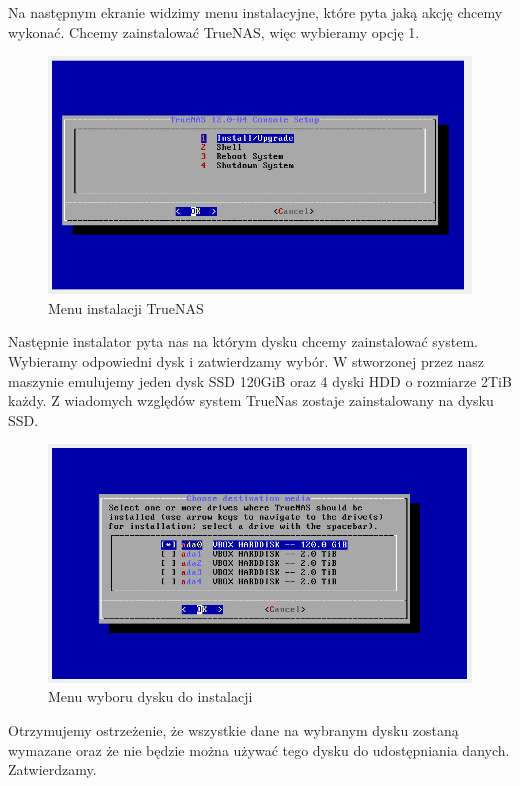 \documentclass[12pt,a4paper]{article}
\newcommand{\<}{\langle}
\renewcommand{\>}{\rangle}
\theoremstyle{definition}
\begin{document}
Na następnym ekranie widzimy menu instalacyjne, które pyta jaką akcję chcemy wykonać. Chcemy zainstalować TrueNAS, więc wybieramy opcję 1.

\begin{figure}[H]
    \centering
    \includegraphics[width=\linewidth]{img/ss_truenas/3.png}
    \caption{Menu instalacji TrueNAS}
    \label{install_menu}
\end{figure}

Następnie instalator pyta nas na którym dysku chcemy zainstalować system. Wybieramy odpowiedni dysk i zatwierdzamy wybór. W stworzonej przez nasz maszynie emulujemy jeden dysk SSD 120GiB oraz 4 dyski HDD o rozmiarze 2TiB każdy. Z wiadomych względów system TrueNas zostaje zainstalowany na dysku SSD.

\begin{figure}[H]
    \centering
    \includegraphics[width=\linewidth]{img/ss_truenas/4.png}
    \caption{Menu wyboru dysku do instalacji}
    \label{install_disk_menu}
\end{figure}

Otrzymujemy ostrzeżenie, że wszystkie dane na wybranym dysku zostaną wymazane oraz że nie będzie można używać tego dysku do udostępniania danych. Zatwierdzamy.
\end{document}
